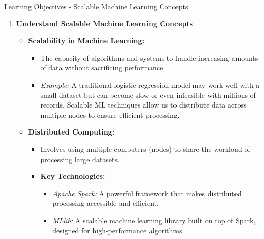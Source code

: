 \documentclass[aspectratio=169]{beamer}
\begin{document}
\begin{frame}[fragile]{Learning Objectives - Scalable Machine Learning Concepts}
  \begin{enumerate}
    \item \textbf{Understand Scalable Machine Learning Concepts}
    \begin{itemize}
      \item \textbf{Scalability in Machine Learning:}
        \begin{itemize}
          \item The capacity of algorithms and systems to handle increasing amounts of data without sacrificing performance.
          \item \textit{Example:} A traditional logistic regression model may work well with a small dataset but can become slow or even infeasible with millions of records. Scalable ML techniques allow us to distribute data across multiple nodes to ensure efficient processing.
        \end{itemize}
        
      \item \textbf{Distributed Computing:}
        \begin{itemize}
          \item Involves using multiple computers (nodes) to share the workload of processing large datasets.
          \item \textbf{Key Technologies:}
            \begin{itemize}
              \item \textit{Apache Spark:} A powerful framework that makes distributed processing accessible and efficient.
              \item \textit{MLlib:} A scalable machine learning library built on top of Spark, designed for high-performance algorithms.
            \end{itemize}
        \end{itemize}
    \end{itemize}
  \end{enumerate}
\end{frame}
\end{document}
